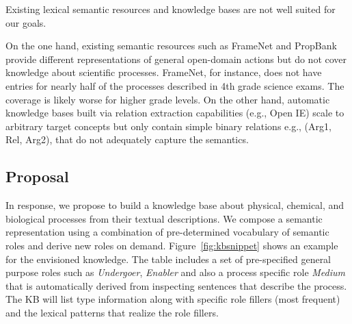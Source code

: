 Existing lexical semantic resources and knowledge bases are not well suited for our goals.

On the one hand, existing semantic resources such as FrameNet and PropBank provide different representations of 
general open-domain actions but do not cover knowledge about scientific processes. 
FrameNet, for instance, does not have entries for nearly half of the processes described in 4th grade science exams. 
The coverage is likely worse for higher grade levels. 
On the other hand, automatic knowledge bases built via relation extraction
capabilities (e.g., Open IE) scale to arbitrary target concepts but only contain simple binary relations e.g., (Arg1, Rel, Arg2), that do not adequately capture the semantics.

\subsection{Proposal}

In response, we propose to build a knowledge base about physical, chemical, and biological processes from their textual descriptions. 
We compose a semantic representation using a combination of pre-determined vocabulary of semantic roles and derive new roles on demand. Figure~\ref{fig:kbsnippet} shows an example for the envisioned knowledge. The table includes a set of pre-specified general purpose roles such as {\em Undergoer}, {\em Enabler} and also a process specific role {\em Medium} that is automatically derived from inspecting sentences that describe the process. The KB will list type information along with specific role fillers (most frequent) and the lexical patterns that realize the role fillers.

